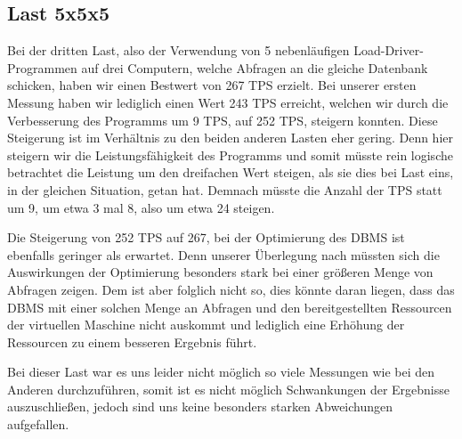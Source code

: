 \clearpage

\subsection{Last 5x5x5}
Bei der dritten Last, also der Verwendung von 5 nebenläufigen
Load-Driver-Programmen auf drei Computern, welche Abfragen an die gleiche
Datenbank schicken, haben wir einen Bestwert von 267 TPS erzielt. Bei unserer
ersten Messung haben wir lediglich einen Wert 243 TPS erreicht, welchen wir
durch die Verbesserung des Programms um 9 TPS, auf 252 TPS, steigern konnten.
Diese Steigerung  ist im Verhältnis zu den beiden anderen Lasten eher gering.
Denn hier steigern wir die Leistungsfähigkeit des Programms und somit müsste
rein logische betrachtet die Leistung um den dreifachen Wert steigen, als sie
dies bei Last eins, in der gleichen Situation, getan hat. Demnach müsste die
Anzahl der TPS statt um 9, um etwa 3 mal 8, also um etwa 24 steigen.

Die Steigerung von 252 TPS auf 267, bei der Optimierung des DBMS ist ebenfalls
geringer als erwartet. Denn unserer Überlegung nach müssten sich die
Auswirkungen der Optimierung besonders stark bei einer größeren Menge von
Abfragen zeigen. Dem ist aber folglich nicht so, dies könnte daran liegen, dass
das DBMS mit einer solchen Menge an Abfragen und den bereitgestellten
Ressourcen der virtuellen Maschine nicht auskommt und lediglich eine Erhöhung
der Ressourcen zu einem besseren Ergebnis führt.

Bei dieser Last war es uns leider nicht möglich so viele Messungen wie bei den
Anderen durchzuführen, somit ist es nicht möglich Schwankungen der Ergebnisse
auszuschließen, jedoch sind uns keine besonders starken Abweichungen
aufgefallen.

\clearpage